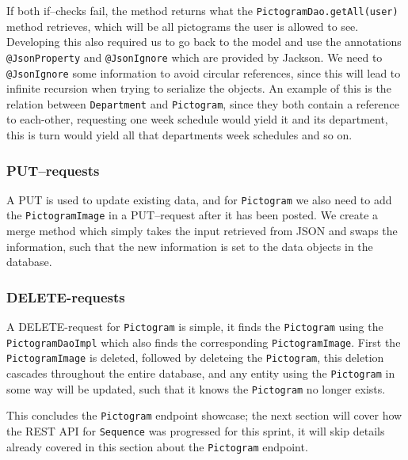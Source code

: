 If both if--checks fail, the method returns what the \texttt{PictogramDao.getAll(user)} method retrieves, which will be all pictograms the user is allowed to see.
Developing this also required us to go back to the model and use the annotations \texttt{@JsonProperty} and \texttt{@JsonIgnore} which are provided by Jackson.
We need to \texttt{@JsonIgnore} some information to avoid circular references, since this will lead to infinite recursion when trying to serialize the objects.
An example of this is the relation between \texttt{Department} and \texttt{Pictogram}, since they both contain a reference to each-other, requesting one week schedule would yield it and its department, this is turn would yield all that departments week schedules and so on.

\subsubsection*{PUT--requests}
A PUT is used to update existing data, and for \texttt{Pictogram} we also need to add the \texttt{PictogramImage} in a PUT--request after it has been posted.
We create a merge method which simply takes the input retrieved from JSON and swaps the information, such that the new information is set to the data objects in the database.

\subsubsection*{DELETE-requests}
A DELETE-request for \texttt{Pictogram} is simple, it finds the \texttt{Pictogram} using the \texttt{PictogramDaoImpl} which also finds the corresponding \texttt{PictogramImage}.
First the \texttt{PictogramImage} is deleted, followed by deleteing the \texttt{Pictogram}, this deletion cascades throughout the entire database, and any entity using the \texttt{Pictogram} in some way will be updated, such that it knows the \texttt{Pictogram} no longer exists.


This concludes the \texttt{Pictogram} endpoint showcase; the next section will cover how the REST API for \texttt{Sequence} was progressed for this sprint, it will skip details already covered in this section about the \texttt{Pictogram} endpoint.
